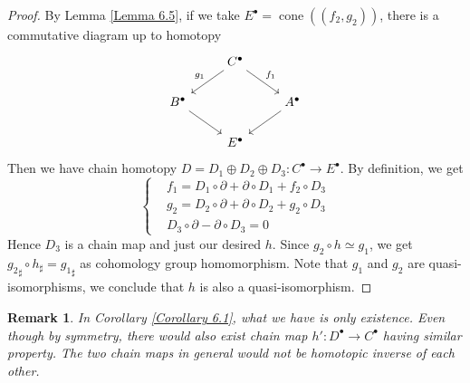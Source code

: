 \documentclass{ctexart}
\newtheorem{remark}{Remark}[section]
\newcommand{\cone}{\operatorname{cone}}
\begin{document}
\begin{proof}
    By Lemma \ref{Lemma 6.5}, if we take $E^{\bullet} = \cone((f_{2}, g_{2}))$,
    there is a commutative diagram up to homotopy
    \begin{equation}
        \begin{tikzcd}
            & C^{\bullet} \arrow[dr, "f_{1}"] \arrow[dl, "g_{1}" swap] & \\
            B^{\bullet} \arrow[dr] &&
            A^{\bullet} \arrow[dl] \\
            & E^{\bullet} &
        \end{tikzcd}
    \end{equation}
    Then we have chain homotopy $D = D_{1} \oplus D_{2} \oplus D_{3}: C^{\bullet} \rightarrow E^{\bullet}$.
    By definition, we get
    \begin{equation}
        \left\{
            \begin{aligned}
                & f_{1} = D_{1} \circ \partial + \partial \circ D_{1} + f_{2} \circ D_{3} \\ 
                & g_{2} = D_{2} \circ \partial + \partial \circ D_{2} + g_{2} \circ D_{3} \\
                & D_{3} \circ \partial - \partial \circ D_{3} = 0
            \end{aligned}
        \right.
    \end{equation}
    Hence $D_{3}$ is a chain map and just our desired $h$.
    Since $g_{2} \circ h \simeq g_{1}$, we get ${g_{2}}_{\sharp} \circ h_{\sharp} = {g_{1}}_{\sharp}$ as cohomology group homomorphism.
    Note that $g_{1}$ and $g_{2}$ are quasi-isomorphisms, we conclude that $h$ is also a quasi-isomorphism.
\end{proof}
\begin{remark}
    In Corollary \ref{Corollary 6.1}, what we have is only existence.
    Even though by symmetry, there would also exist chain map $h': D^{\bullet} \rightarrow C^{\bullet}$ having similar property.
    The two chain maps in general would not be homotopic inverse of each other. 
\end{remark}
\end{document}
